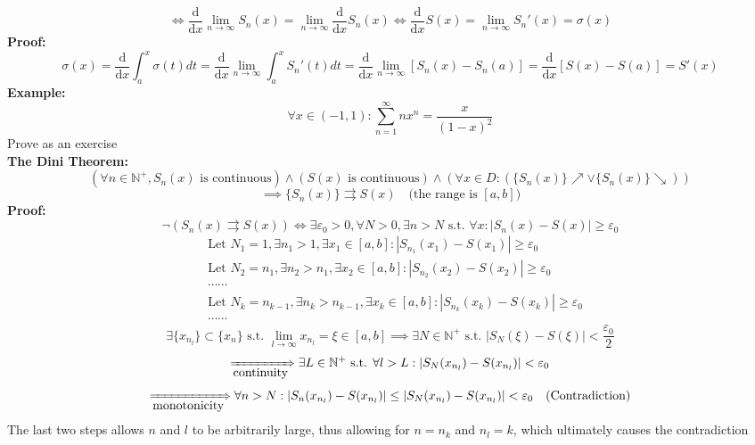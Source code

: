 \documentclass{article}
\newcommand{\N}{\mathbb{N}}
\newcommand{\ucov}{\rightrightarrows}
\newcommand{\mdec}{\searrow}
\newcommand{\minc}{\nearrow}
\newcommand{\infsum}{\sum\limits_{n=1}^\infty}
\newcommand{\limninf}{\lim\limits_{n\to\infty}}
\newcommand{\difx}{\dfrac{\mbox{d}}{\mbox{d}x}}
\newcommand{\st}{\mbox{ s.t. }}
\newcommand{\0}{{\bf{0}}}
\begin{document}
$$\iff\difx\limninf S_n(x)=\limninf\difx S_n(x)\iff\difx S(x)=\limninf S_n'(x)=\sigma(x)$$
\textbf{Proof:}
$$\sigma(x)=\difx\int_a^x\sigma(t)dt=\difx\limninf\int_a^xS_n'(t)dt=\difx\limninf[S_n(x)-S_n(a)]=\difx[S(x)-S(a)]=S'(x)$$
\textbf{Example:}
$$\forall x\in(-1,1):\infsum nx^n=\frac{x}{(1-x)^2}$$
\null\hfill{Prove as an exercise}\\
\textbf{The Dini Theorem:}
$$(\forall n\in\N^+,S_n(x)\mbox{ is continuous})\land(S(x)\mbox{ is continuous})\land(\forall x\in D:(\{S_n(x)\}\minc\lor\{S_n(x)\}\mdec))$$
$$\implies \{S_n(x)\}\ucov S(x)\quad\mbox{(the range is $[a,b]$)}$$
\textbf{Proof:}
$$\neg(S_n(x)\rightrightarrows S(x))\iff\exists\varepsilon_0>0,\forall N>0,\exists n>N\mbox{ s.t. }\forall x:|S_n(x)-S(x)|\geq\varepsilon_0$$
\begin{equation}
\begin{split}
    &\mbox{Let }N_1=1,\exists n_1>1,\exists x_1\in [a,b]:|S_{n_1}(x_1)-S(x_1)|\geq\varepsilon_0\\
    &\mbox{Let }N_2=n_1,\exists n_2>n_1,\exists x_2\in [a,b]:|S_{n_2}(x_2)-S(x_2)|\geq\varepsilon_0\\
    &\cdots\cdots\\
    &\mbox{Let }N_k=n_{k-1},\exists n_k>n_{k-1},\exists x_k\in [a,b]:|S_{n_k}(x_k)-S(x_k)|\geq\varepsilon_0\\
    &\cdots\cdots
\end{split}
\end{equation}
$$\exists\{x_{n_l}\}\subset\{x_n\}\st\lim_{l\to\infty}x_{n_l}=\xi\in[a,b]\implies\exists N\in\N^+\st|S_N(\xi)-S(\xi)|<\frac{\varepsilon_0}{2}$$
$$\xRightarrow[\mbox{continuity}]{}\exists L\in\N^+\st\forall l>L:|S_N(x_{n_l})-S(x_{n_l})|<\varepsilon_0$$
$$\xRightarrow[\mbox{monotonicity}]{}\forall n>N:|S_n(x_{n_l})-S(x_{n_l})|\le|S_N(x_{n_l})-S(x_{n_l})|<\varepsilon_0\quad(\mbox{Contradiction})$$
The last two steps allows $n$ and $l$ to be arbitrarily large, thus allowing for $n=n_k$ and $n_l=k$, which ultimately causes the contradiction
\end{document}
